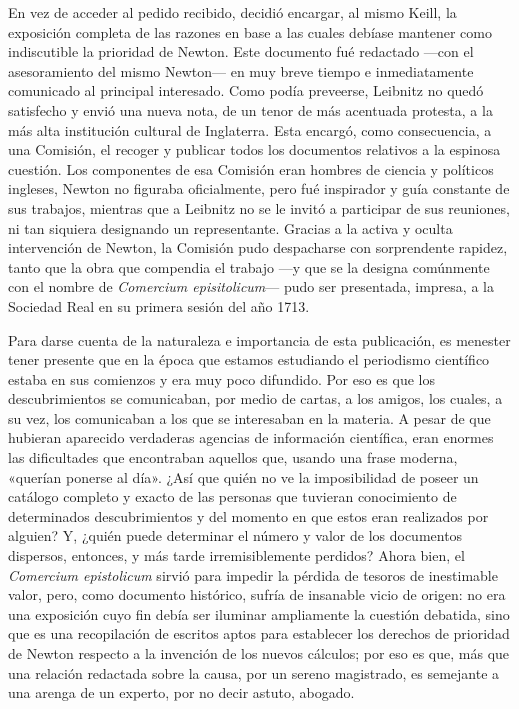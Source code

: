 \documentclass[a4paper, 12pt, draft]{article}
\begin{document}
{En vez de acceder al pedido recibido, decidió encargar, al mismo Keill, la exposición completa de las razones en base a las cuales debíase mantener como indiscutible la prioridad de Newton. Este documento fué redactado ---con el asesoramiento del mismo Newton--- en muy breve tiempo e inmediatamente comunicado al principal interesado. Como podía preveerse, Leibnitz no quedó satisfecho y envió una nueva nota, de un tenor de más acentuada protesta, a la más alta institución cultural de Inglaterra. Esta encargó, como consecuencia, a una Comisión, el recoger y publicar todos los documentos relativos a la espinosa cuestión. Los componentes de esa Comisión eran hombres de ciencia y políticos ingleses, Newton no figuraba oficialmente, pero fué inspirador y guía constante de sus trabajos, mientras que a Leibnitz no se le invitó a participar de sus reuniones, ni tan siquiera designando un representante. Gracias a la activa y oculta intervención de Newton, la Comisión pudo despacharse con sorprendente rapidez, tanto que la obra que compendia el trabajo ---y que se la designa comúnmente con el
nombre de \textit{ Comercium episitolicum}---
pudo ser presentada, impresa, a la Sociedad Real en su primera sesión del año 1713.

Para darse cuenta de la naturaleza e importancia de esta publicación, es menester tener presente que en la época que estamos estudiando el periodismo científico estaba en sus comienzos y era muy poco difundido. Por eso es que los descubrimientos se comunicaban, por medio de cartas, a los amigos, los cuales, a su vez, los comunicaban a los que se interesaban en la materia. A pesar de que hubieran aparecido verdaderas agencias de información científica, eran enormes las dificultades que encontraban aquellos que, usando una frase moderna, «querían ponerse al día». ¿Así que quién no ve la imposibilidad de poseer un catálogo completo y exacto de las personas que tuvieran conocimiento de determinados descubrimientos y del momento en que estos eran realizados por alguien? Y, ¿quién puede determinar el número y valor de los documentos dispersos, entonces, y más tarde irremisiblemente perdidos? Ahora bien, el \textit{ Comercium epistolicum} sirvió para impedir la pérdida de tesoros de inestimable valor, pero, como documento histórico, sufría de insanable vicio de origen: no era una exposición cuyo fin debía ser iluminar ampliamente la cuestión debatida, sino que es una recopilación de escritos aptos para establecer los derechos de prioridad de Newton respecto a la invención de los nuevos cálculos; por eso es que, más que una relación redactada sobre la causa, por un sereno magistrado, es semejante a una arenga de un experto, por no decir astuto, abogado.

}
\end{document}
